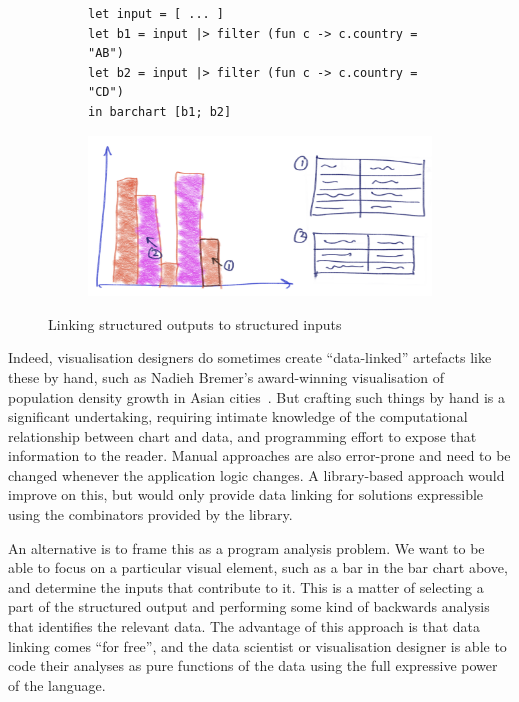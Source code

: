 \begin{figure}[H]
   \begin{subfigure}{0.35\textwidth}
      \small
      \begin{lstlisting}
let input = [ ... ]
let b1 = input |> filter (fun c -> c.country = "AB")
let b2 = input |> filter (fun c -> c.country = "CD")
in barchart [b1; b2]
      \end{lstlisting}
   \end{subfigure}
   \begin{subfigure}{0.63\textwidth}
      {\includegraphics[scale=0.05]{fig/example/data-linking.png}}
   \end{subfigure}
   \caption{Linking structured outputs to structured inputs}
   \label{fig:introduction:data-linking}
\end{figure}

Indeed, visualisation designers do sometimes create ``data-linked'' artefacts like these by hand, such as Nadieh Bremer's award-winning visualisation of population density growth in Asian cities~\cite{bremer15}. But crafting such things by hand is a significant undertaking, requiring intimate knowledge of the computational relationship between chart and data, and programming effort to expose that information to the reader. Manual approaches are also error-prone and need to be changed whenever the application logic changes. A library-based approach would improve on this, but would only provide data linking for solutions expressible using the combinators provided by the library.

An alternative is to frame this as a program analysis problem. We want to be able to focus on a particular visual element, such as a bar in the bar chart above, and determine the inputs that contribute to it. This is a matter of selecting a part of the structured output and performing some kind of backwards analysis that identifies the relevant data. The advantage of this approach is that data linking comes ``for free'', and the data scientist or visualisation designer is able to code their analyses as pure functions of the data using the full expressive power of the language.

